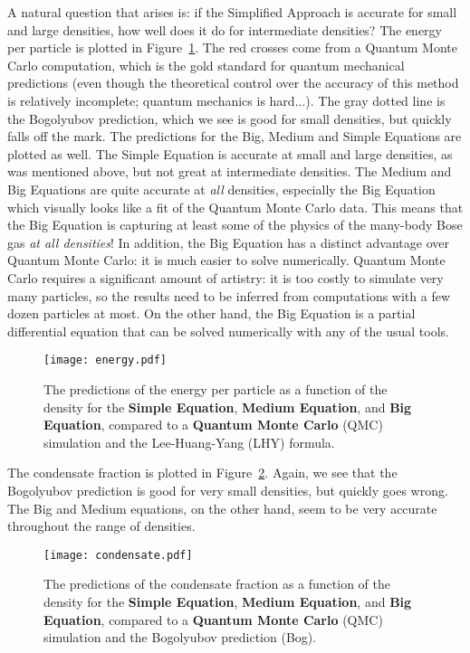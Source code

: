 \documentclass{ian}
\def\eqformat#1{{\bf\color{#1}#1}}
\begin{document}
\indent
A natural question that arises is: if the Simplified Approach is accurate for small and large densities, how well does it do for intermediate densities?
The energy per particle is plotted in Figure\-~\ref{fig:energy}.
The red crosses come from a Quantum Monte Carlo computation, which is the gold standard for quantum mechanical predictions (even though the theoretical control over the accuracy of this method is relatively incomplete; quantum mechanics is hard...).
The gray dotted line is the Bogolyubov prediction, which we see is good for small densities, but quickly falls off the mark.
The predictions for the Big, Medium and Simple Equations are plotted as well.
The Simple Equation is accurate at small and large densities, as was mentioned above, but not great at intermediate densities.
The Medium and Big Equations are quite accurate at {\it all} densities, especially the Big Equation which visually looks like a fit of the Quantum Monte Carlo data.
This means that the Big Equation is capturing at least some of the physics of the many-body Bose gas {\it at all densities}!
In addition, the Big Equation has a distinct advantage over Quantum Monte Carlo: it is much easier to solve numerically.
Quantum Monte Carlo requires a significant amount of artistry: it is too costly to simulate very many particles, so the results need to be inferred from computations with a few dozen particles at most.
On the other hand, the Big Equation is a partial differential equation that can be solved numerically with any of the usual tools.
\bigskip

\begin{figure}
  \hfil\texttt{[image: energy.pdf]}
  \caption{%
    \cite[Fig 1]{CHe21} The predictions of the energy per particle as a function of the density for the \eqformat{Simple Equation}, \eqformat{Medium Equation}, and \eqformat{Big Equation}, compared to a \eqformat{Quantum Monte Carlo} (QMC) simulation and the Lee-Huang-Yang (LHY) formula.
  }
  \label{fig:energy}
\end{figure}

\indent
The condensate fraction is plotted in Figure\-~\ref{fig:condensate}.
Again, we see that the Bogolyubov prediction is good for very small densities, but quickly goes wrong.
The Big and Medium equations, on the other hand, seem to be very accurate throughout the range of densities.
\bigskip

\begin{figure}
  \hfil\texttt{[image: condensate.pdf]}
  \caption{%
    \cite[Fig 3]{CHe21} The predictions of the condensate fraction as a function of the density for the \eqformat{Simple Equation}, \eqformat{Medium Equation}, and \eqformat{Big Equation}, compared to a \eqformat{Quantum Monte Carlo} (QMC) simulation and the Bogolyubov prediction (Bog).
  }
  \label{fig:condensate}
\end{figure}
\end{document}
